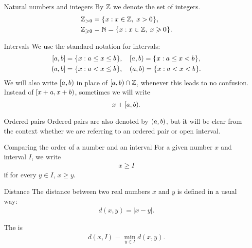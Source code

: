 \documentclass[12pt]{memoir}
\renewcommand{\le}{\leq}
\begin{document}
\begin{flushdescription}

\item [Natural numbers and integers] 
By \( \mathbb{Z} \) we denote the set of integers.
\begin{align*}
   \mathbb{Z}_{>0}&=\mathopen\{\mskip 1mu x : x\in \mathbb{Z},\;  x>0\mskip 1mu\mathclose\}, \\
   \mathbb{Z}_{\geqslant 0}&=\mathbb{N}=\mathopen\{\mskip 1mu x : x\in \mathbb{Z},\;  x\geqslant 0\mskip 1mu\mathclose\}.
\end{align*}

\item [Intervals]
We use the standard notation for intervals:
\begin{align*}
   \clint{a}{b}&=\setOf{x}{a\le x \le b},\quad \lint{a}{b}=\setOf{x}{a\le x < b}, \\
   \rint{a}{b}&=\setOf{x}{a< x \le b}, \quad  \opint{a}{b}=\setOf{x}{a< x < b}.
\end{align*}
We will also write \( [a,b) \) in place of \( [a,b)\cap \mathbb{Z} \), 
whenever this leads to no confusion.
Instead of \( [x+a,x+b) \), sometimes we will write 
\begin{align*}x + [a,b).\end{align*}

\item [Ordered pairs]
Ordered pairs are also denoted by \( (a,b) \),
but it will be clear from the context whether we are
referring to an ordered pair or open interval.

\item [Comparing the order of a number and an interval]
For a given number \( x \) and interval \( I \), we
write
\begin{align*} x \ge I \end{align*}
if for every \( y\in I \),  \( x \ge y \).

\item [Distance]
The distance between two real numbers \( x \) and \( y \) is defined
in a usual way:
\begin{align*}
    d(x,y)= |x-y|.
\end{align*}

The   is
\begin{align*}
    d(x,I)= \min_{y\in I}d(x,y).
\end{align*}


\end{flushdescription}
\end{document}
